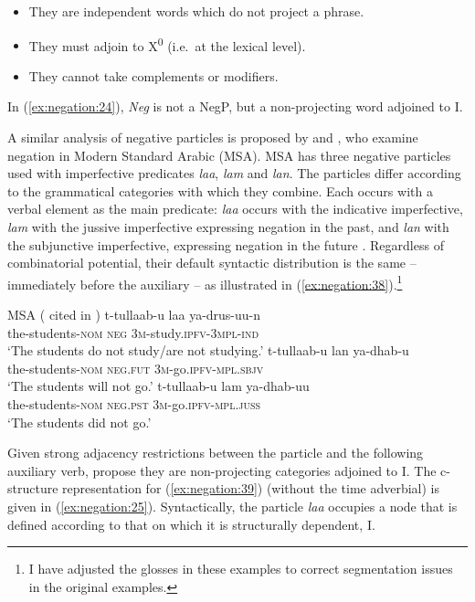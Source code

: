\documentclass[output=paper,hidelinks]{langscibook}
\begin{document}
\begin{itemize}
\item They are independent words which do not project a phrase.
\item They must adjoin to X\textsuperscript{0} (i.e.\ at the lexical level).
\item They cannot take complements or modifiers.
\end{itemize}
In (\ref{ex:negation:24}), \emph{Neg} is not a NegP, but a non-projecting word adjoined to I. 

A similar analysis of negative particles is proposed by \citet{AlsharifSadler:09} and \citet{Alsharif:PhD}, who examine negation in Modern Standard Arabic (MSA). MSA has three negative particles used with imperfective predicates \emph{laa}, \emph{lam} and \emph{lan}. The particles differ according to the grammatical categories with which they combine. Each occurs with a verbal element as the main predicate: \emph{laa} occurs with the indicative imperfective, \emph{lam} with the jussive imperfective expressing negation in the past, and \emph{lan}  with the subjunctive imperfective, expressing negation in the future \citep [8] {AlsharifSadler:09}. Regardless of combinatorial potential, their default syntactic distribution is  the same -- immediately before the auxiliary -- as illustrated in (\ref{ex:negation:38}).\footnote{I have adjusted the glosses in these examples to correct segmentation issues in the original examples.}
 
\ea\label{ex:negation:38} MSA (\citealt [95] {Benmamoun:funct} cited in \citealt [7-8] {AlsharifSadler:09})
\ea
\gll t-tullaab-u laa ya-drus-uu-n\\
the-students-\textsc{nom} \textsc{neg} \textsc{3m}-study.\textsc{ipfv-3mpl-ind}\\
\glt `The students do not study/are not studying.'
\ex
\gll t-tullaab-u lan ya-dhab-u\\
the-students-\textsc{nom} \textsc{neg.fut} \textsc{3m}-go.\textsc{ipfv-mpl.sbjv}\\
\glt `The students will not go.'
\ex
\gll t-tullaab-u lam ya-dhab-uu\\
the-students-\textsc{nom} \textsc{neg.pst}  \textsc{3m}-go.\textsc{ipfv-mpl.juss}\\
\glt `The students did not go.' 
\z\z

Given strong adjacency restrictions between the particle and the following auxiliary verb, \citet{AlsharifSadler:09} propose they are non-projecting categories adjoined to I. The c-structure representation for (\ref{ex:negation:39}) (without the time adverbial) is given in (\ref{ex:negation:25}). Syntactically, the particle \emph{laa} occupies a node {} that is defined according to that on which it is structurally dependent, {I}. 
\end{document}

